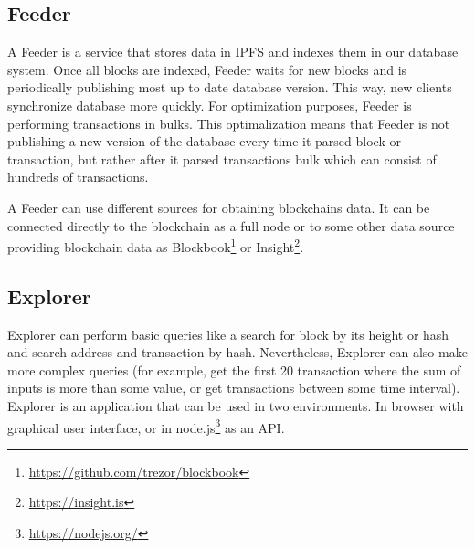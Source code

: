 \subsection{Feeder}
A Feeder is a service that stores data in IPFS and indexes them in our database system. Once all blocks are indexed, Feeder waits for new blocks and is periodically publishing most up to date database version. This way, new clients synchronize database more quickly. For optimization purposes, Feeder is performing transactions in bulks. This optimalization means that Feeder is not publishing a new version of the database every time it parsed block or transaction, but rather after it parsed transactions bulk which can consist of hundreds of transactions.  

A Feeder can use different sources for obtaining blockchains data. It can be connected directly to the blockchain as a full node or to some other data source providing blockchain data as Blockbook\footnote{\url{https://github.com/trezor/blockbook}} or Insight\footnote{\url{https://insight.is}}.


\subsection{Explorer}
Explorer can perform basic queries like a search for block by its height or hash and search address and transaction by hash. Nevertheless, Explorer can also make more complex queries (for example, get the first 20 transaction where the sum of inputs is more than some value, or get transactions between some time interval). Explorer is an application that can be used in two environments. In browser with graphical user interface, or in node.js\footnote{\url{https://nodejs.org/}} as an API.

